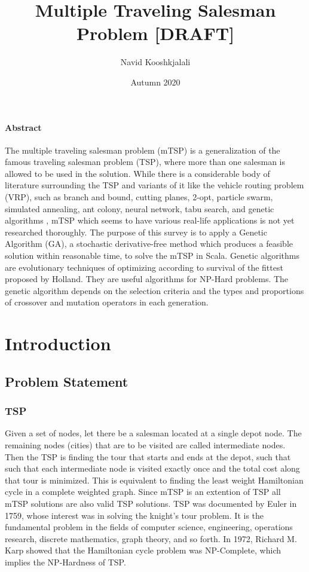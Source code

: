 \documentclass[11pt]{article}
\title{Multiple Traveling Salesman Problem [DRAFT]}
\author{Navid Kooshkjalali}
\date{Autumn 2020}
\begin{document}
\maketitle
\vspace*{2cm}
\paragraph{Abstract}
The multiple traveling salesman problem (mTSP) is a generalization of the famous traveling salesman problem (TSP), where more than one salesman is allowed to be used in the solution. While there is a considerable body of literature surrounding the TSP and variants of it like the vehicle routing problem (VRP), such as branch and bound\cite{branchnbound}, cutting planes\cite{cuttingplanes}, 2-opt\cite{twoopt}, particle swarm\cite{pswarm}, simulated annealing\cite{annealing}, ant colony\cite{ant1, ant2}, neural network\cite{nn}, tabu search\cite{tabu}, and genetic algorithms \cite{holland75, ga1, ga2, ga3}, mTSP which seems to have various real-life applications is not yet researched thoroughly. The purpose of this survey is to apply a Genetic Algorithm (GA), a stochastic derivative-free method which produces a feasible solution within reasonable time, to solve the mTSP in Scala. Genetic algorithms are evolutionary techniques of optimizing according to survival of the fittest proposed by Holland\cite{holland75}. They are useful algorithms for NP-Hard problems. The genetic algorithm depends on the selection criteria and the types and proportions of crossover and mutation operators in each generation.
\newpage
\section{Introduction}
\subsection{Problem Statement}

\subsubsection{TSP}
Given a set of nodes, let there be a salesman located at a single depot node. The remaining nodes (cities) that are to be visited are called intermediate nodes. Then the TSP is finding the tour that starts and ends at the depot, such that such that each intermediate node is visited exactly once and the total cost along that tour is minimized. This is equivalent to finding the least weight Hamiltonian cycle in a complete weighted graph. Since mTSP is an extention of TSP all mTSP solutions are also valid TSP solutions. TSP was documented by Euler in 1759, whose interest was in solving the knight’s tour problem. It is the fundamental problem in the fields of computer science, engineering, operations research, discrete mathematics, graph theory, and so forth. In 1972, Richard M. Karp showed that the Hamiltonian cycle problem was NP-Complete, which implies the NP-Hardness of TSP.
\end{document}
